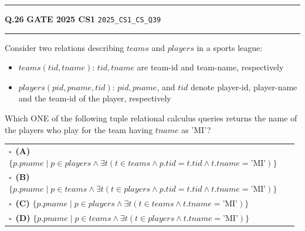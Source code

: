\documentclass[a4paper,10pt]{article}
\begin{document}
\vspace{6pt}\hrule height 0.35pt\vspace{6pt}
\noindent
\begin{tcolorbox}[
    blanker,
    sidebyside,
    sidebyside align=top,
    lefthand width=0.55\textwidth,
    top=4pt, bottom=4pt, left=0pt, right=0pt,
    middle=16pt,
    underlay={
        \draw[dashed, black!80, line width=0.8pt, dash pattern=on 4pt off 3pt]
            ([xshift=0.55\textwidth+8pt]frame.north west) --
            ([xshift=0.55\textwidth+8pt]frame.south west);
    }
]
\textbf{Q.26}  \hfill {\footnotesize\textbf{GATE 2025 CS1} \quad \tiny\texttt{2025\_CS1\_CS\_Q39}}
\vspace{2pt}\hrule height 0.3pt\vspace{4pt}

Consider two relations describing $teams$ and $players$ in a sports league:
\begin{itemize}
\item $teams(tid, tname)$: $tid, tname$ are team-id and team-name, respectively
\item $players(pid, pname, tid)$: $pid, pname$, and $tid$ denote player-id, player-name and the team-id of the player, respectively
\end{itemize}
Which ONE of the following tuple relational calculus queries returns the name of the players who play for the team having $tname$ as 'MI'?

\par\vspace{6pt}\noindent
\begin{tabular}{@{}p{0.98\linewidth}@{}}
$\square$\ \textbf{(A)} $\{ p.pname \mid p \in players \land \exists t (t \in teams \land p.tid = t.tid \land t.tname = \text{'MI'}) \}$ \\
\addlinespace[3pt]
$\square$\ \textbf{(B)} $\{ p.pname \mid p \in teams \land \exists t (t \in players \land p.tid = t.tid \land t.tname = \text{'MI'}) \}$ \\
\addlinespace[3pt]
$\square$\ \textbf{(C)} $\{ p.pname \mid p \in players \land \exists t (t \in teams \land t.tname = \text{'MI'}) \}$ \\
\addlinespace[3pt]
$\square$\ \textbf{(D)} $\{ p.pname \mid p \in teams \land \exists t (t \in players \land t.tname = \text{'MI'}) \}$
\end{tabular}

\tcblower


\end{tcolorbox}
\end{document}
